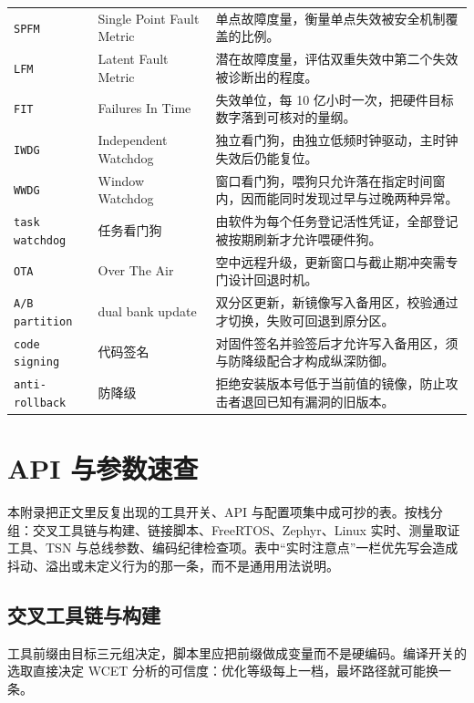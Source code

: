 \documentclass[12pt,a4paper,fontset=fandol]{ctexbook}
\newcommand{\Tp}[1]{\texttt{#1}}
\begin{document}
\begin{longtable}{@{} >{\raggedright\arraybackslash}p{} >{\raggedright\arraybackslash}p{} >{\raggedright\arraybackslash}p{}@{}}
\Tp{SPFM} & Single Point Fault Metric & 单点故障度量，衡量单点失效被安全机制覆盖的比例。 \\
\Tp{LFM} & Latent Fault Metric & 潜在故障度量，评估双重失效中第二个失效被诊断出的程度。 \\
\Tp{FIT} & Failures In Time & 失效单位，每 10 亿小时一次，把硬件目标数字落到可核对的量纲。 \\
\Tp{IWDG} & Independent Watchdog & 独立看门狗，由独立低频时钟驱动，主时钟失效后仍能复位。 \\
\Tp{WWDG} & Window Watchdog & 窗口看门狗，喂狗只允许落在指定时间窗内，因而能同时发现过早与过晚两种异常。 \\
\Tp{task watchdog} & 任务看门狗 & 由软件为每个任务登记活性凭证，全部登记被按期刷新才允许喂硬件狗。 \\
\Tp{OTA} & Over The Air & 空中远程升级，更新窗口与截止期冲突需专门设计回退时机。 \\
\Tp{A/B partition} & dual bank update & 双分区更新，新镜像写入备用区，校验通过才切换，失败可回退到原分区。 \\
\Tp{code signing} & 代码签名 & 对固件签名并验签后才允许写入备用区，须与防降级配合才构成纵深防御。 \\
\Tp{anti-rollback} & 防降级 & 拒绝安装版本号低于当前值的镜像，防止攻击者退回已知有漏洞的旧版本。 \\
\end{longtable}

\chapter{API 与参数速查}

\label{ap:apB-api-quickref}

本附录把正文里反复出现的工具开关、API 与配置项集中成可抄的表。按栈分组：交叉工具链与构建、链接脚本、FreeRTOS、Zephyr、Linux 实时、测量取证工具、TSN 与总线参数、编码纪律检查项。表中``实时注意点''一栏优先写会造成抖动、溢出或未定义行为的那一条，而不是通用用法说明。

\section{交叉工具链与构建}

工具前缀由目标三元组决定，脚本里应把前缀做成变量而不是硬编码。编译开关的选取直接决定 WCET 分析的可信度：优化等级每上一档，最坏路径就可能换一条。
\end{document}
